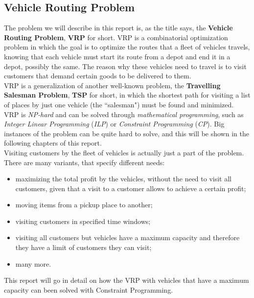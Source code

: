 \documentclass[../main.tex]{subfiles}
\begin{document}
\subsection{Vehicle Routing Problem}
The problem we will describe in this report is, as the title says, the \textbf{Vehicle Routing Problem}, \textbf{VRP} for short.
VRP is a combinatorial optimization problem in which the goal is to optimize the routes that a fleet of vehicles travels, knowing that each vehicle must start its route
from a depot and end it in a depot, possibly the same. The reason why these vehicles need to travel is to visit customers that demand certain goods to be delivered to them.\\
VRP is a generalization of another well-known problem, the \textbf{Travelling Salesman Problem}, \textbf{TSP} for short, in which the shortest path for visiting a list of places by just one vehicle (the ``salesman") must be found and minimized.
VRP is \textit{NP-hard} and can be solved through \textit{mathematical programming}, such as \textit{Integer Linear Programming} (\textit{ILP}) or \textit{Constraint Programming} (\textit{CP}).
Big instances of the problem can be quite hard to solve, and this will be shown in the following chapters of this report.\\
Visiting customers by the fleet of vehicles is actually just a part of the problem. There are many variants, that specify different needs:
\begin{itemize}
    \item maximizing the total profit by the vehicles, without the need to visit all customers, given that a visit to a customer allows to achieve a certain profit;
    \item moving items from a pickup place to another;
    \item visiting customers in specified time windows;
    \item visiting all customers but vehicles have a maximum capacity and therefore they have a limit of customers they can visit;
    \item many more.
\end{itemize}
This report will go in detail on how the VRP with vehicles that have a maximum capacity can been solved with Constraint Programming.
\end{document}

